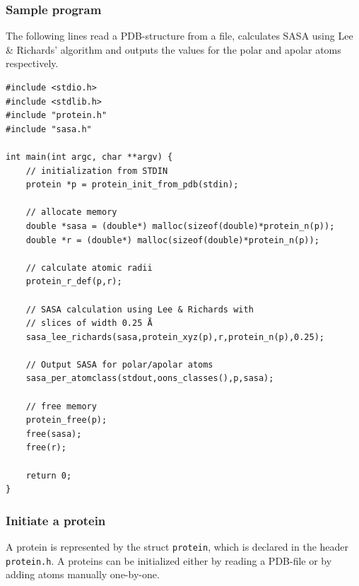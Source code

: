\documentclass[a4paper,11pt]{article}
\begin{document}
\subsubsection{Sample program}
The following lines read a PDB-structure from a file, calculates
SASA using Lee \& Richards' algorithm and outputs the values for the
polar and apolar atoms respectively.
\begin{verbatim}
#include <stdio.h>
#include <stdlib.h>
#include "protein.h"
#include "sasa.h"

int main(int argc, char **argv) {
    // initialization from STDIN
    protein *p = protein_init_from_pdb(stdin);

    // allocate memory
    double *sasa = (double*) malloc(sizeof(double)*protein_n(p));
    double *r = (double*) malloc(sizeof(double)*protein_n(p));

    // calculate atomic radii
    protein_r_def(p,r);
    
    // SASA calculation using Lee & Richards with 
    // slices of width 0.25 Å
    sasa_lee_richards(sasa,protein_xyz(p),r,protein_n(p),0.25);

    // Output SASA for polar/apolar atoms
    sasa_per_atomclass(stdout,oons_classes(),p,sasa);
   
    // free memory
    protein_free(p);
    free(sasa);
    free(r);

    return 0;
}
\end{verbatim}

\subsubsection{Initiate a protein}

A protein is represented by the struct \texttt{protein}, which is
declared in the header \texttt{protein.h}. A proteins can be
initialized either by reading a PDB-file or by adding atoms manually
one-by-one.
\end{document}
